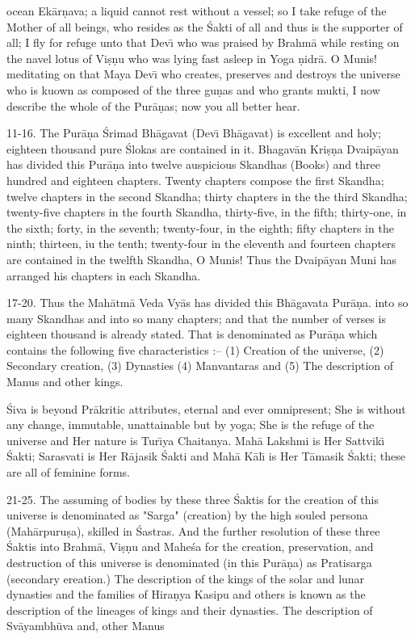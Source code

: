 ocean Ek\=ar\d{n}ava; a liquid cannot rest without a vessel; so I take refuge of the Mother of all beings, who resides as the \'Sakti of all and thus is the supporter of all; I fly for refuge unto that Dev\={\i} who was praised by Brahm\=a while resting on the navel lotus of Vi\d{s}\d{n}u who was lying fast asleep in Yoga \d{n}idr\=a. O Munis! meditating on that Maya Dev\={\i} who creates, preserves and destroys the universe who is kuown as composed of the three gu\d{n}as and who grants mukti, I now describe the whole of the
Pur\=a\d{n}as; now you all better hear.

11-16. The Pur\=a\d{n}a \'Srimad Bh\=agavat (Dev\={\i} Bh\=agavat) is excellent and holy; eighteen thousand pure \'Slokas are contained in it. Bhagav\=an Kri\d{s}\d{n}a Dvaip\=ayan has divided this Pur\=a\d{n}a into twelve auspicious Skandhas (Books) and three hundred and eighteen chapters. Twenty chapters compose the first Skandha; twelve chapters in the second Skandha; thirty chapters in the the third Skandha; twenty-five chapters in the fourth Skandha, thirty-five, in the fifth; thirty-one, in the sixth; forty, in the seventh; twenty-four, in the eighth; fifty chapters in the ninth; thirteen, iu the tenth; twenty-four in the eleventh and fourteen chapters are contained in the twelfth Skandha, O Munis! Thus the Dvaip\=ayan Muni has arranged his chapters in each Skandha.

17-20. Thus the Mah\=atm\=a Veda Vy\=as has divided this Bh\=agavata Pur\=a\d{n}a. into so many Skandhas and into so many chapters; and that the number of verses is eighteen thousand is already stated. That is denominated as Pur\=a\d{n}a which contains the following five characteristics :-- (1) Creation of the universe, (2) Secondary creation, (3) Dynasties (4) Manvantaras and (5) The description of Manus and other kings.

\'Siva is beyond Pr\=akritic attributes, eternal and ever omnipresent; She is without any change, immutable, unattainable but by yoga; She is the refuge of the universe and Her nature is Tur\={\i}ya Chaitanya. Mah\=a Lakshmi is Her Sattvik\={\i} \'Sakti; Sarasvati is Her R\=ajasik \'Sakti and Mah\=a K\=al\={\i} is Her T\=amasik \'Sakti; these are all of feminine forms.

21-25. The assuming of bodies by these three \'Saktis for the creation of this universe is denominated as "Sarga" (creation) by the high souled persona (Mah\=arpuru\d{s}a), skilled in \'Sastras. And the further resolution of these three \'Saktis into Brahm\=a, Vi\d{s}\d{n}u and Mahe\'sa for the creation, preservation, and destruction of this universe is denominated (in this Pur\=a\d{n}a) as Pratisarga (secondary ereation.) The description of the kings of the solar and lunar dynasties and the families of Hira\d{n}ya Kasipu and others is known as the description of the lineages of kings and their dynasties. The description of Sv\=ayambh\=uva and, other Manus


